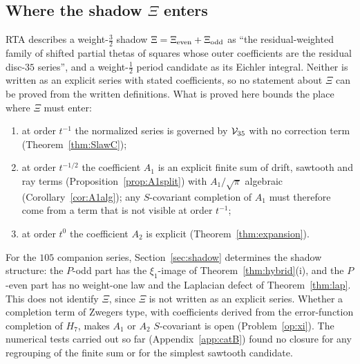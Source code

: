 \subsection{Where the shadow $\Xi$ enters}
RTA describes a weight-$\frac32$ shadow $\Xi=\Xi_{\rm even}+\Xi_{\rm odd}$ as ``the residual-weighted family of shifted partial thetas of squares whose outer coefficients are the
residual disc-$35$ series'', and a weight-$\frac12$ period candidate as its Eichler integral. Neither is written as an explicit series with stated coefficients, so no
statement about $\Xi$ can be proved from the written definitions. What is proved here bounds the place where $\Xi$ must enter:
\begin{enumerate}[label=(\roman*),leftmargin=2em]
\item at order $t^{-1}$ the normalized series is governed by $\mathcal V_{35}$ with no correction term (Theorem~\ref{thm:SlawC});
\item at order $t^{-1/2}$ the coefficient $A_1$ is an explicit finite sum of drift, sawtooth and ray terms (Proposition~\ref{prop:A1split}) with $A_1/\sqrt\pi$ algebraic
(Corollary~\ref{cor:A1alg}); any $S$-covariant completion of $A_1$ must therefore come from a term that is not visible at order $t^{-1}$;
\item at order $t^0$ the coefficient $A_2$ is explicit (Theorem~\ref{thm:expansion}).
\end{enumerate}
For the $105$ companion series, Section~\ref{sec:shadow} determines the shadow structure: the $P$-odd part has the $\xi_1$-image of
Theorem~\ref{thm:hybrid}(i), and the $P$-even part has no weight-one law and the Laplacian defect of Theorem~\ref{thm:lap}. This does not identify $\Xi$, since $\Xi$ is
not written as an explicit series. Whether a completion term of Zwegers type, with coefficients derived from the error-function completion of $H_7$, makes $A_1$ or $A_2$ $S$-covariant is open
(Problem~\ref{op:xi}). The numerical tests carried out so far (Appendix~\ref{app:catB}) found no closure for any regrouping of the finite sum or for the simplest sawtooth
candidate.

